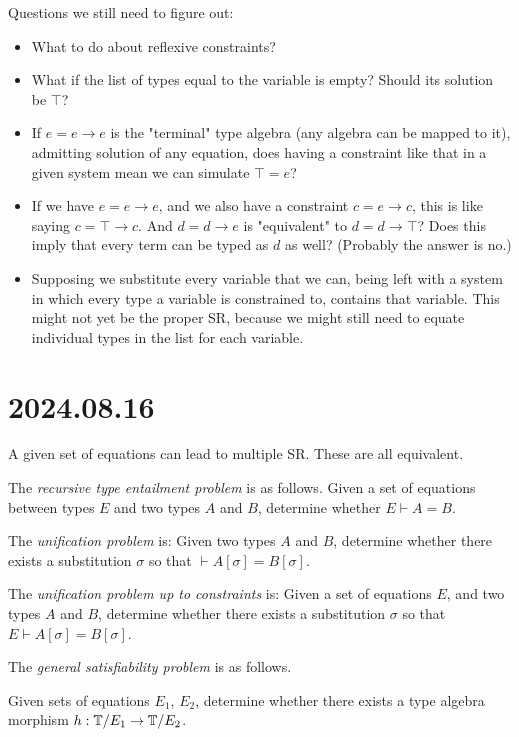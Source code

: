 \documentclass{scrartcl}
\begin{document}
Questions we still need to figure out:
\begin{itemize}
  \item What to do about reflexive constraints?
  \item What if the list of types equal to the variable is empty?
  Should its solution be $\top$?
  \item If $e = e \to e$ is the "terminal" type algebra
  (any algebra can be mapped to it), admitting solution of any equation,
  does having a constraint like that in a given system mean we can simulate
  $\top = e$?
  \item If we have $e = e \to e$, and we also have a constraint $c = e \to c$,
  this is like saying $c = \top \to c$.  And $d = d \to e$ is "equivalent" to
   $d = d \to \top$?  Does this imply that every term can be typed as $d$ as well?
   (Probably the answer is no.)
   \item Supposing we substitute every variable that we can,
   being left with a system in which every type a variable is constrained to,
   contains that variable.  This might not yet be the proper SR, because we
   might still need to equate individual types in the list for each variable.
\end{itemize}

\section{2024.08.16}

A given set of equations can lead to multiple SR.  These are all equivalent.

The \emph{recursive type entailment problem} is as follows.
Given a set of equations between types $E$ and two types $A$ and $B$,
determine whether $E \vdash A = B$.

The \emph{unification problem} is: Given two types $A$ and $B$,
determine whether there exists a substitution $\sigma$
so that $\vdash A[\sigma] = B[\sigma]$.

The \emph{unification problem up to constraints} is: Given a set of equations $E$,
and two types $A$ and $B$, determine whether there exists a substitution $\sigma$
so that $E \vdash A[\sigma] = B[\sigma]$.


The \emph{general satisfiability problem} is as follows.

Given sets of equations $E_1$, $E_2$, determine whether there exists
a type algebra morphism $h : \mathbb{T}/E_1 \to \mathbb{T}/E_2$.
\end{document}
